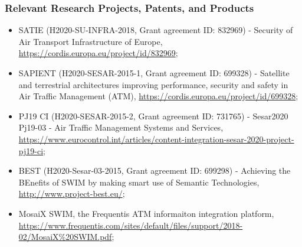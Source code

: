 \documentclass[a4paper,11pt]{article}
\begin{document}
\subsubsection*{Relevant Research Projects, Patents, and Products}

\begin{itemize}

\item SATIE (H2020-SU-INFRA-2018, Grant agreement ID: 832969) - Security of Air Transport Infrastructure of Europe, \url{https://cordis.europa.eu/project/id/832969};

\item SAPIENT (H2020-SESAR-2015-1, Grant agreement ID: 699328) - Satellite and terrestrial architectures improving performance, security and safety in Air Traffic Management (ATM), \url{https://cordis.europa.eu/project/id/699328};

\item PJ19 CI (H2020-SESAR-2015-2, Grant agreement ID: 731765) - Sesar2020 Pj19-03 - Air Traffic Management Systems and Services, \url{https://www.eurocontrol.int/articles/content-integration-sesar-2020-project-pj19-ci};

\item BEST (H2020-Sesar-03-2015, Grant agreement ID: 699298) - Achieving the BEnefits of SWIM by making smart use of Semantic Technologies, \url{http://www.project-best.eu/};




\item MosaiX SWIM, the Frequentis ATM informaiton integration platform, \url{https://www.frequentis.com/sites/default/files/support/2018-02/MosaiX\%20SWIM.pdf}; 

\end{itemize}

\pagebreak
{}
\end{document}
